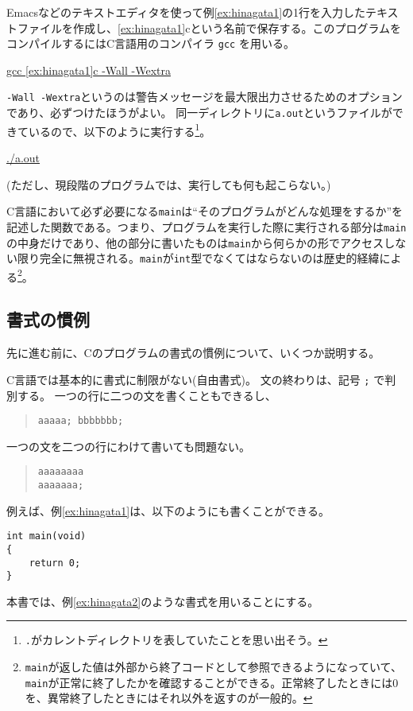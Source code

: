 Emacsなどのテキストエディタを使って例\ref{ex:hinagata1}の1行を入力したテキストファイルを作成し、\ref{ex:hinagata1}cという名前で保存する。このプログラムをコンパイルするにはC言語用のコンパイラ \texttt{gcc} を用いる。
\begin{commandline2}
    \prompt \underline{gcc \ref{ex:hinagata1}c -Wall -Wextra}
\end{commandline2} \noindent
\texttt{-Wall -Wextra}というのは警告メッセージを最大限出力させるためのオプションであり、必ずつけたほうがよい。
同一ディレクトリに\texttt{a.out}というファイルができているので、以下のように実行する\footnote{\texttt{.}がカレントディレクトリを表していたことを思い出そう。}。
\begin{commandline2}
    \prompt \underline{./a.out}
\end{commandline2} \noindent
(ただし、現段階のプログラムでは、実行しても何も起こらない。)

C言語において必ず必要になる\texttt{main}は``そのプログラムがどんな処理をするか''を記述した関数である。つまり、プログラムを実行した際に実行される部分は\texttt{main}の中身だけであり、他の部分に書いたものは\texttt{main}から何らかの形でアクセスしない限り完全に無視される。\texttt{main}が\texttt{int}型でなくてはならないのは歴史的経緯による\footnote{\texttt{main}が返した値は外部から終了コードとして参照できるようになっていて、\texttt{main}が正常に終了したかを確認することができる。正常終了したときには0を、異常終了したときにはそれ以外を返すのが一般的。}。

\subsection{書式の慣例}

先に進む前に、Cのプログラムの書式の慣例について、いくつか説明する。

C言語では基本的に書式に制限がない(自由書式)。
文の終わりは、記号 \texttt{;} で判別する。
一つの行に二つの文を書くこともできるし、
\begin{quote}
\begin{verbatim}
aaaaa; bbbbbbb;
\end{verbatim}
\end{quote}
一つの文を二つの行にわけて書いても問題ない。
\begin{quote}
\begin{verbatim}
aaaaaaaa
aaaaaaa;
\end{verbatim}
\end{quote}
例えば、例\ref{ex:hinagata1}は、以下のようにも書くことができる。
\begin{reidai}\label{ex:hinagata2}
    \begin{verbatim}
int main(void)
{
    return 0;
}
\end{verbatim}
\end{reidai} \noindent
本書では、例\ref{ex:hinagata2}のような書式を用いることにする。

